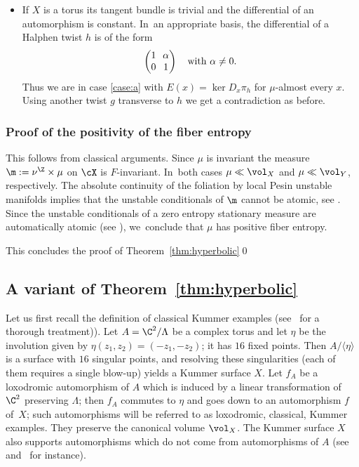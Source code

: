 \begin{itemize}
\item
If $X$ is a torus its tangent bundle is trivial and the differential of an automorphism is
constant. In~an appropriate basis, the differential of a Halphen twist $h$ is of the form
\begin{equation*}\arraycolsep3.5pt
\begin{pmatrix} 1 & \alpha \\ 0 & 1 \end{pmatrix} \quad\text{with } \alpha\neq 0.
\end{equation*}
Thus we are in case \eqref{case:a} with $E(x) = \ker D_x\pi_h$ for $\mu$-almost every $x$. Using another
twist $g$ transverse to $h$ we get a contradiction as before.
\end{itemize}

\subsubsection{Proof of the positivity of the fiber entropy} \label{subs:proof_positivity_entropy}
This follows from classical arguments. Since $\mu$ is invariant the measure $\m:=\nu^\Z\times \mu$ on $\cX$ is
$F$-invariant. In~both cases $\mu\ll \vol_X$ and $\mu\ll \vol_Y$, respectively.
The absolute continuity of the foliation by local Pesin unstable manifolds implies that
the unstable conditionals of $\m$ cannot be atomic, see
\eg \cite[Th.\,B, \S 3]{ledrappier-young3}.
Since the unstable conditionals of
a zero entropy stationary measure are automatically atomic (see \cite[Cor.\,7.14]{stiffness}), we~conclude that
$\mu$ has positive fiber entropy.

This concludes the proof of Theorem~\ref{thm:hyperbolic}\qed

\subsection{A variant of Theorem~\ref{thm:hyperbolic}}
Let us first recall the definition of classical Kummer examples
(see~\cite[\S 4]{finite_orbits} for a thorough treatment)).
Let $A = \C^2/\Lambda$ be a complex torus and let $\eta$ be the involution given by $\eta(z_1, z_2) = (-z_1, -z_2)$; it has $16$
fixed points. Then $A/\langle\eta\rangle$ is a
surface with $16$ singular points, and resolving these singularities (each of them requires a single blow-up)
yields a Kummer surface $X$.
Let $f_A$ be a loxodromic automorphism of $A$ which is induced by a linear transformation of $\C^2$ preserving $\Lambda$;
then $f_A$ commutes to $\eta$ and goes down to an automorphism $f$ of~$X$; such automorphisms will be referred to as
loxodromic, classical, Kummer examples. They preserve the canonical volume $\vol_X$. The Kummer surface $X$
also supports automorphisms which do not come from automorphisms of $A$ (see~\cite{Keum-Kondo} and~\cite{Dolgachev-Keum} for instance).

